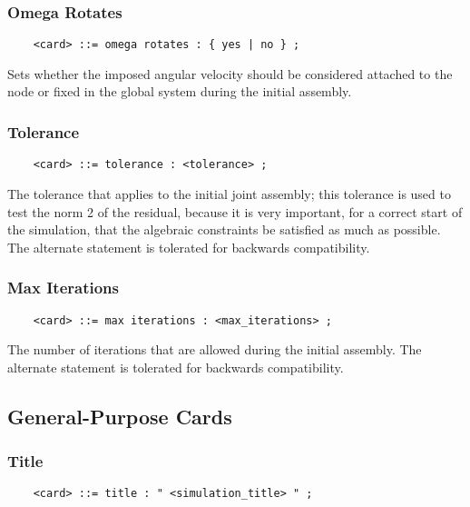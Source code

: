 \subsubsection{Omega Rotates}
\begin{verbatim}
    <card> ::= omega rotates : { yes | no } ;
\end{verbatim}
Sets whether the imposed angular velocity should be considered attached 
to the node or fixed in the global system during the initial assembly.

\subsubsection{Tolerance}
\begin{verbatim}
    <card> ::= tolerance : <tolerance> ;
\end{verbatim}
The tolerance that applies to the initial joint assembly; 
this tolerance is used to test the norm 2 of the residual,
because it is very important, for a correct start of the simulation,
that the algebraic constraints be satisfied as much as possible.
The alternate statement  is tolerated 
for backwards compatibility.

\subsubsection{Max Iterations}
\begin{verbatim}
    <card> ::= max iterations : <max_iterations> ;
\end{verbatim}
The number of iterations that are allowed during the initial assembly.
The alternate statement  is tolerated
for backwards compatibility.

\subsection{General-Purpose Cards}

\subsubsection{Title}
\begin{verbatim}
    <card> ::= title : " <simulation_title> " ;
\end{verbatim}


